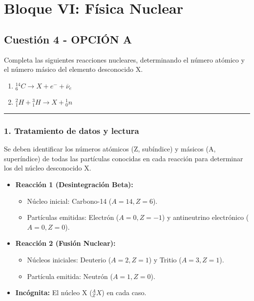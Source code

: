 \newpage

\section{Bloque VI: Física Nuclear}
\label{sec:nuclear2_2004_sep_cv}

\subsection{Cuestión 4 - OPCIÓN A}
\label{subsec:6A_2004_sep_cv}

\begin{cajaenunciado}
Completa las siguientes reacciones nucleares, determinando el número atómico y el número másico del elemento desconocido X.
\begin{enumerate}
    \item ${}_{6}^{14}C \rightarrow X + e^{-} + \overline{\nu}_e$
    \item ${}_{1}^{2}H + {}_{1}^{3}H \rightarrow X + {}_{0}^{1}n$
\end{enumerate}
\end{cajaenunciado}
\hrule

\subsubsection*{1. Tratamiento de datos y lectura}
Se deben identificar los números atómicos (Z, subíndice) y másicos (A, superíndice) de todas las partículas conocidas en cada reacción para determinar los del núcleo desconocido X.
\begin{itemize}
    \item \textbf{Reacción 1 (Desintegración Beta):}
        \begin{itemize}
            \item Núcleo inicial: Carbono-14 ($A=14, Z=6$).
            \item Partículas emitidas: Electrón ($A=0, Z=-1$) y antineutrino electrónico ($A=0, Z=0$).
        \end{itemize}
    \item \textbf{Reacción 2 (Fusión Nuclear):}
        \begin{itemize}
            \item Núcleos iniciales: Deuterio ($A=2, Z=1$) y Tritio ($A=3, Z=1$).
            \item Partícula emitida: Neutrón ($A=1, Z=0$).
        \end{itemize}
    \item \textbf{Incógnita:} El núcleo X ($ {}_{Z}^{A}X $) en cada caso.
\end{itemize}

